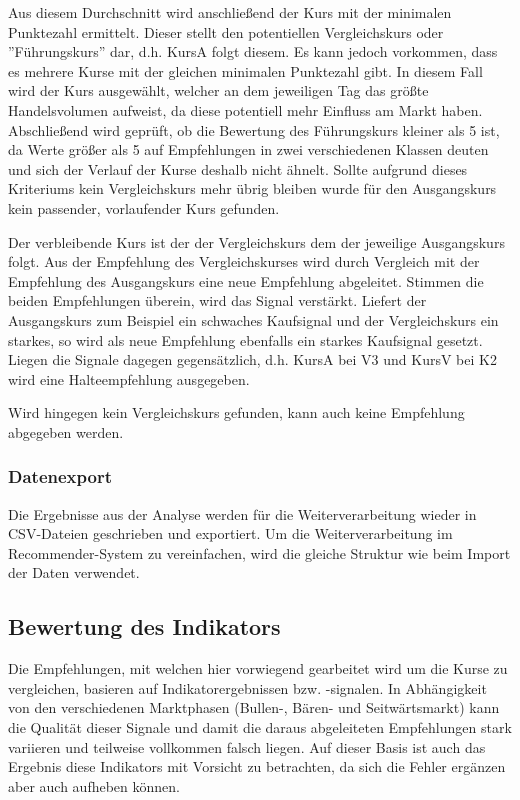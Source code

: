 Aus diesem Durchschnitt wird anschließend der Kurs mit der minimalen Punktezahl ermittelt. Dieser stellt den potentiellen Vergleichskurs oder ''Führungskurs'' dar, d.h. KursA folgt diesem. Es kann jedoch vorkommen, dass es mehrere Kurse mit der gleichen minimalen Punktezahl gibt. In diesem Fall wird der Kurs ausgewählt, welcher an dem jeweiligen Tag das größte Handelsvolumen aufweist, da diese potentiell mehr Einfluss am Markt haben. Abschließend wird geprüft, ob die Bewertung des Führungskurs kleiner als 5 ist, da Werte größer als 5 auf Empfehlungen in zwei verschiedenen Klassen deuten und sich der Verlauf der Kurse deshalb nicht ähnelt. Sollte aufgrund dieses Kriteriums kein Vergleichskurs mehr übrig bleiben wurde für den Ausgangskurs kein passender, vorlaufender Kurs gefunden.  

Der verbleibende Kurs ist der der Vergleichskurs dem der jeweilige Ausgangskurs folgt. Aus der Empfehlung des Vergleichskurses wird durch Vergleich mit der Empfehlung des Ausgangskurs eine neue Empfehlung abgeleitet. Stimmen die beiden Empfehlungen überein, wird das Signal verstärkt. Liefert der Ausgangskurs zum Beispiel ein schwaches Kaufsignal und der Vergleichskurs ein starkes, so wird als neue Empfehlung ebenfalls ein starkes Kaufsignal gesetzt. Liegen die Signale dagegen gegensätzlich, d.h. KursA bei V3 und KursV bei K2 wird eine Halteempfehlung ausgegeben.

Wird hingegen kein Vergleichskurs gefunden, kann auch keine Empfehlung abgegeben werden.

\subsubsection{Datenexport}
Die Ergebnisse aus der Analyse werden für die Weiterverarbeitung wieder in CSV-Dateien geschrieben und exportiert. Um die Weiterverarbeitung im Recommender-System zu vereinfachen, wird die gleiche Struktur wie beim Import der Daten verwendet. 

\subsection{Bewertung des Indikators}
Die Empfehlungen, mit welchen hier vorwiegend gearbeitet wird um die Kurse zu vergleichen, basieren auf Indikatorergebnissen bzw. -signalen. In Abhängigkeit von den verschiedenen Marktphasen (Bullen-, Bären- und Seitwärtsmarkt) kann die Qualität dieser Signale und damit die daraus abgeleiteten Empfehlungen stark variieren und teilweise vollkommen falsch liegen. Auf dieser Basis ist auch das Ergebnis diese Indikators mit Vorsicht zu betrachten, da sich die Fehler ergänzen aber auch aufheben können. 

